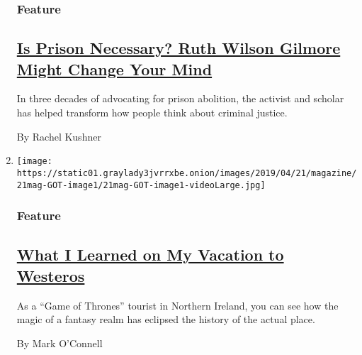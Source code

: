 \begin{enumerate}
  \hypertarget{feature-1}{%
  \subsubsection{Feature}\label{feature-1}}

  \hypertarget{is-prison-necessary-ruth-wilson-gilmore-might-change-your-mind}{%
  \subsection{\texorpdfstring{\href{/2019/04/17/magazine/prison-abolition-ruth-wilson-gilmore.html}{Is
  Prison Necessary? Ruth Wilson Gilmore Might Change Your
  Mind}}{Is Prison Necessary? Ruth Wilson Gilmore Might Change Your Mind}}\label{is-prison-necessary-ruth-wilson-gilmore-might-change-your-mind}}

  In three decades of advocating for prison abolition, the activist and
  scholar has helped transform how people think about criminal justice.

  By Rachel Kushner
\item
  \texttt{[image: https://static01.graylady3jvrrxbe.onion/images/2019/04/21/magazine/21mag-GOT-image1/21mag-GOT-image1-videoLarge.jpg]}

  \hypertarget{feature-2}{%
  \subsubsection{Feature}\label{feature-2}}

  \hypertarget{what-i-learned-on-my-vacation-to-westeros}{%
  \subsection{\texorpdfstring{\href{/2019/04/15/magazine/game-of-thrones-northern-ireland-brexit.html}{What
  I Learned on My Vacation to
  Westeros}}{What I Learned on My Vacation to Westeros}}\label{what-i-learned-on-my-vacation-to-westeros}}

  As a ``Game of Thrones'' tourist in Northern Ireland, you can see how
  the magic of a fantasy realm has eclipsed the history of the actual
  place.

  By Mark O'Connell
\end{enumerate}

